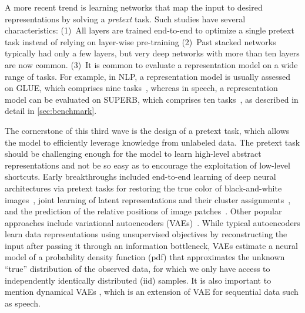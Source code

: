 

A more recent trend is learning networks that map the input to desired
representations by solving a \textit{pretext} task. Such studies have several
characteristics:
(1)~All layers are trained end-to-end to optimize a single pretext task instead
of relying on layer-wise pre-training
(2)~Past stacked networks typically had only a few layers, but 
very deep networks with more than ten layers are now common.
(3)~It is common to evaluate a representation model on a wide range of tasks.
For example, in NLP, a representation model is usually assessed on GLUE,
which comprises nine tasks~\cite{GLUE}, whereas in speech, a representation model can be
evaluated on SUPERB, which comprises ten tasks~\cite{yang21c_interspeech}, 
as described in detail in \cref{sec:benchmark}.

The cornerstone of this third wave is the design of a pretext task, which
allows the model to efficiently leverage knowledge from unlabeled data.
The pretext task should be challenging enough for the model to learn high-level
abstract representations and 
  not be so easy as to encourage the exploitation of low-level shortcuts.  %
Early breakthroughs included end-to-end learning of deep neural architectures
via pretext tasks for restoring the true color of black-and-white
images~\cite{colorizing}, joint learning of latent representations and their
cluster assignments~\cite{deepcluster}, and the prediction of the relative positions of
image patches~\cite{context_pred}. Other popular approaches include variational
autoencoders (VAEs)~\cite{vae, rezende2014stochastic}. While typical autoencoders learn data
representations using unsupervised objectives by reconstructing the input
after passing it through an information bottleneck, VAEs estimate a neural model of a probability density function (pdf) that approximates the unknown “true” distribution of the observed data, for which we only have access to independently identically distributed (iid) samples. It is also important to mention dynamical VAEs \cite{Girin2021}, which is an extension of VAE for sequential data such as speech.

